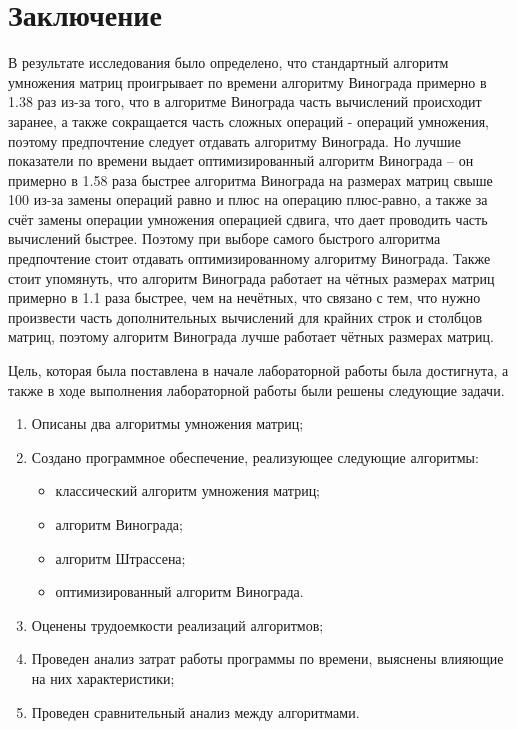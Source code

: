 \chapter*{Заключение}

В результате исследования было определено, что стандартный алгоритм умножения матриц проигрывает по времени алгоритму Винограда примерно в 1.38 раз из-за того, что в алгоритме Винограда часть вычислений происходит заранее, а также сокращается часть сложных операций - операций умножения, поэтому предпочтение следует отдавать алгоритму Винограда. 
Но лучшие показатели по времени выдает оптимизированный алгоритм Винограда -- он примерно в 1.58 раза быстрее алгоритма Винограда на размерах матриц свыше 100 из-за замены операций равно и плюс на операцию плюс-равно, а также за счёт замены операции умножения операцией сдвига, что дает проводить часть вычислений быстрее. 
Поэтому при выборе самого быстрого алгоритма предпочтение стоит отдавать оптимизированному алгоритму Винограда. 
Также стоит упомянуть, что алгоритм Винограда работает на чётных размерах матриц примерно в 1.1 раза быстрее, чем на нечётных, что связано с тем, что нужно произвести часть дополнительных вычислений для крайних строк и столбцов матриц, поэтому алгоритм Винограда лучше работает чётных размерах матриц.

Цель, которая была поставлена в начале лабораторной работы была достигнута, а также в ходе выполнения лабораторной работы были решены следующие задачи.
\begin{enumerate}[label={\arabic*)}]
	\item Описаны два алгоритмы умножения матриц;
	\item Создано программное обеспечение, реализующее следующие алгоритмы:
	\begin{itemize}[label=---]
		\item классический алгоритм умножения матриц;
		\item алгоритм Винограда;
		\item алгоритм Штрассена;
		\item оптимизированный алгоритм Винограда.
	\end{itemize}
	\item Оценены трудоемкости реализаций алгоритмов;
	\item Проведен анализ затрат работы программы по времени, выяснены влияющие на них характеристики;
	\item Проведен сравнительный анализ между алгоритмами.
\end{enumerate}
